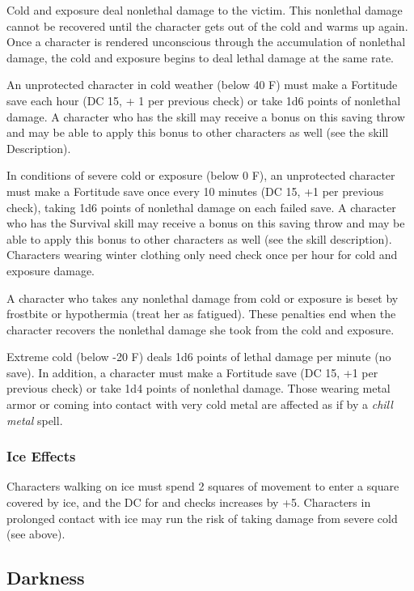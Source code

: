Cold and exposure deal nonlethal damage to the victim. This nonlethal damage cannot 
be recovered until the character gets out of the cold and warms up again. Once 
a character is rendered unconscious through the accumulation of nonlethal damage, 
the cold and exposure begins to deal lethal damage at the same rate.

An unprotected character in cold weather (below 40\textdegree{} F) must make a Fortitude save 
each hour (DC 15, + 1 per previous check) or take 1d6 points of nonlethal damage. 
A character who has the  skill may receive a bonus on this saving throw 
and may be able to apply this bonus to other characters as well (see the skill 
Description).

In conditions of severe cold or exposure (below 0\textdegree{} F), an unprotected character 
must make a Fortitude save once every 10 minutes (DC 15, +1 per previous check), 
taking 1d6 points of nonlethal damage on each failed save. A character who has 
the Survival skill may receive a bonus on this saving throw and may be able to 
apply this bonus to other characters as well (see the skill description). Characters 
wearing winter clothing only need check once per hour for cold and exposure damage.

A character who takes any nonlethal damage from cold or exposure is beset by frostbite 
or hypothermia (treat her as fatigued). These penalties end when the character 
recovers the nonlethal damage she took from the cold and exposure.

Extreme cold (below -20\textdegree{} F) deals 1d6 points of lethal damage per minute (no save). 
In addition, a character must make a Fortitude save (DC 15, +1 per previous check) 
or take 1d4 points of nonlethal damage. Those wearing metal armor or coming into 
contact with very cold metal are affected as if by a \textit{chill metal }spell.

\subsubsection{Ice Effects}

Characters walking on ice must spend 2 squares of movement to enter a square covered 
by ice, and the DC for  and  checks increases by +5. Characters in 
prolonged contact with ice may run the risk of taking damage from severe cold (see 
above).

\subsection{Darkness}

